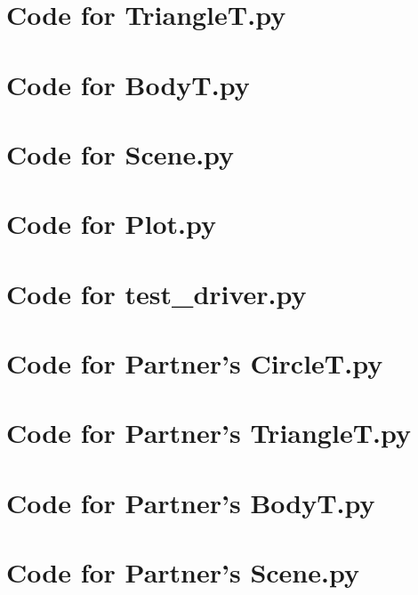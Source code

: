 \documentclass[12pt]{article}
\begin{document}
\newpage

\section{Code for TriangleT.py}

\noindent 

\newpage

\section{Code for BodyT.py}

\noindent 

\newpage

\section{Code for Scene.py}

\noindent 

\newpage

\section{Code for Plot.py}

\noindent 

\newpage

\section{Code for test\_driver.py}

\noindent 

\newpage

\section{Code for Partner's CircleT.py}

\noindent 

\newpage

\section{Code for Partner's TriangleT.py}

\noindent 

\newpage

\section{Code for Partner's BodyT.py}

\noindent 

\newpage

\section{Code for Partner's Scene.py}

\noindent 

\newpage
\end{document}
